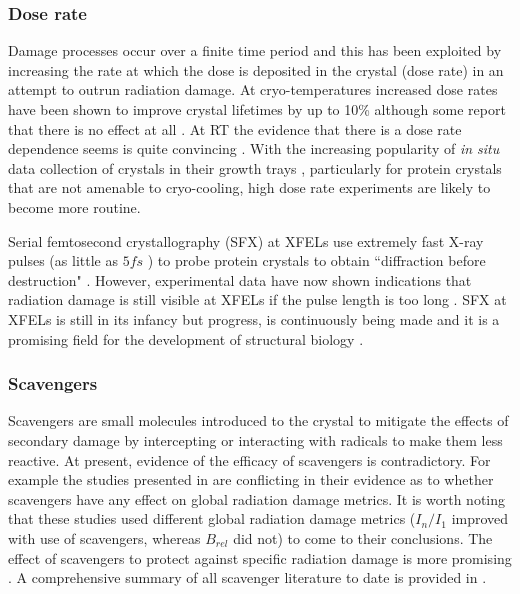         \subsubsection{Dose rate}
        \label{subs:Dose rate}
            Damage processes occur over a finite time period and this has been exploited by increasing the rate at which the dose is deposited in the crystal (dose rate) in an attempt to outrun radiation damage.
			At cryo-temperatures increased dose rates have been shown to improve crystal lifetimes by up to 10\% \cite{owen2006} although some report that there is no effect at all \cite{sliz2003}.
			At RT the evidence that there is a dose rate dependence seems is quite convincing \cite{south2007,owen2012,owen2014}.
			With the increasing popularity of \textit{in situ} data collection of crystals in their growth trays \cite{axford2015structure,axford2012situ}, particularly for protein crystals that are not amenable to cryo-cooling, high dose rate experiments are likely to become more routine.

            Serial femtosecond crystallography (SFX) at XFELs use extremely fast X-ray pulses (as little as $5 fs$ \cite{boutet2012high}) to probe protein crystals to obtain ``diffraction before destruction" \cite{chapman2014diffraction}.
			However, experimental data have now shown indications that radiation damage is still visible at XFELs if the pulse length is too long \cite{nass2015indications}.
			SFX at XFELs is still in its infancy but progress, is continuously being made and it is a promising field for the development of structural biology \cite{garman2014,brooks2015nobel}.


        \subsubsection{Scavengers}
        \label{subs:Scavengers}
            Scavengers are small molecules introduced to the crystal to mitigate the effects of secondary damage by intercepting or interacting with radicals to make them less reactive.
			At present, evidence of the efficacy of scavengers is contradictory.
			For example the studies presented in \cite{barker2009room,kmetko2011can} are conflicting in their evidence as to whether scavengers have any effect on global radiation damage metrics.
			It is worth noting that these studies used different global radiation damage metrics ($I_n/I_1$ improved with use of scavengers, whereas $B_{rel}$ did not) to come to their conclusions.
			The effect of scavengers to protect against specific radiation damage is more promising \cite{southworth2007radioprotectant}.
			A comprehensive summary of all scavenger literature to date is provided in \cite{allan2012}.

